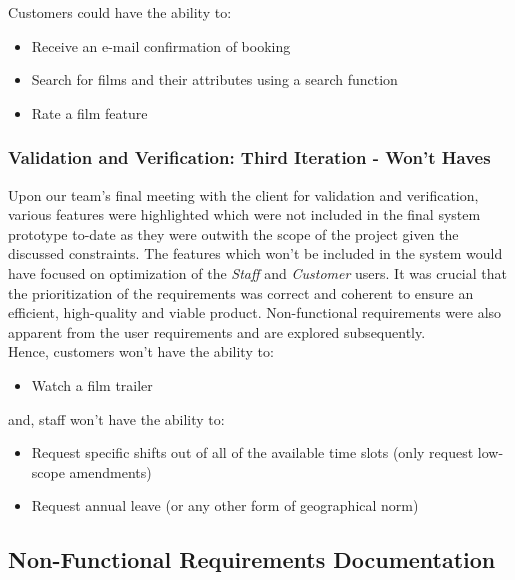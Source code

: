 \documentclass[11pt, english]{article}
\begin{document}
	Customers could have the ability to:

	\begin{itemize}
        \setlength\itemsep{0cm}
		\item Receive an e-mail confirmation of booking
		\item Search for films and their attributes using a search function
		\item Rate a film feature
	\end{itemize}

		\subsubsection{Validation and Verification: Third Iteration - Won't Haves}

	Upon our team's final meeting with the client for validation and verification, various features were highlighted which were not included in the final system prototype to-date as they were outwith the scope of the project given the discussed constraints. The features which won't be included in the system would have focused on optimization of the \textit{Staff} and \textit{Customer} users. It was crucial that the prioritization of the requirements was correct and coherent to ensure an efficient, high-quality and viable product. Non-functional requirements were also apparent from the user requirements and are explored subsequently.\\

	Hence, customers won't have the ability to:

	\begin{itemize}
        \setlength\itemsep{0cm}
                \item Watch a film trailer
        \end{itemize}

	and, staff won't have the ability to:

	\begin{itemize}
        \setlength\itemsep{0cm}
		\item Request specific shifts out of all of the available time slots (only request low-scope amendments)
		\item Request annual leave (or any other form of geographical norm)
        \end{itemize}
	
	\subsection{Non-Functional Requirements Documentation}
\end{document}
